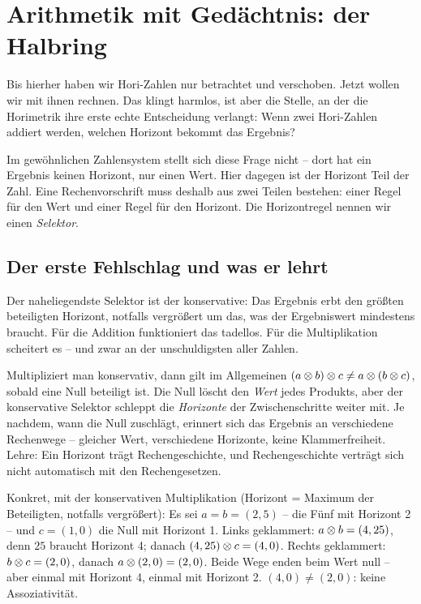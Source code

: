 \chapter{Arithmetik mit Gedächtnis: der Halbring}
\label{ch:arithmetik}


Bis hierher haben wir Hori-Zahlen nur betrachtet und verschoben.
Jetzt wollen wir mit ihnen rechnen. Das klingt harmlos,
ist aber die Stelle, an der die Horimetrik ihre erste echte
Entscheidung verlangt: Wenn zwei Hori-Zahlen addiert werden, welchen
Horizont bekommt das Ergebnis?

Im gewöhnlichen Zahlensystem stellt sich diese Frage nicht -- dort hat
ein Ergebnis keinen Horizont, nur einen Wert. Hier dagegen ist der
Horizont Teil der Zahl. Eine Rechenvorschrift muss deshalb aus zwei
Teilen bestehen: einer Regel für den Wert und einer Regel für den
Horizont. Die Horizontregel nennen wir einen \emph{Selektor}.

\section{Der erste Fehlschlag und was er lehrt}

Der naheliegendste Selektor ist der konservative: Das Ergebnis erbt
den größten beteiligten Horizont, notfalls vergrößert um das, was der
Ergebniswert mindestens braucht. Für die Addition funktioniert das
tadellos. Für die Multiplikation scheitert es -- und zwar an der
unschuldigsten aller Zahlen.

\begin{sackgasse}
Multipliziert man konservativ, dann gilt im Allgemeinen
$(a\otimes b)\otimes c\ne a\otimes(b\otimes c)$, sobald eine Null
beteiligt ist. Die Null löscht den \emph{Wert} jedes Produkts, aber
der konservative Selektor schleppt die \emph{Horizonte} der
Zwischenschritte weiter mit. Je nachdem, wann die Null zuschlägt,
erinnert sich das Ergebnis an verschiedene Rechenwege -- gleicher
Wert, verschiedene Horizonte, keine Klammerfreiheit. Lehre: Ein
Horizont trägt Rechengeschichte, und Rechengeschichte verträgt sich
nicht automatisch mit den Rechengesetzen.
\end{sackgasse}

\begin{beispiel}
Konkret, mit der konservativen Multiplikation (Horizont = Maximum
der Beteiligten, notfalls vergrößert): Es sei $a=b=(2,5)$ -- die
Fünf mit Horizont 2 -- und $c=(1,0)$ die Null mit Horizont 1. Links
geklammert: $a\otimes b=(4,25)$, denn $25$ braucht Horizont 4;
danach $(4,25)\otimes c=(4,0)$. Rechts geklammert:
$b\otimes c=(2,0)$, danach $a\otimes(2,0)=(2,0)$. Beide Wege enden
beim Wert null -- aber einmal mit Horizont 4, einmal mit Horizont 2.
$(4,0)\ne(2,0)$: keine Assoziativität.
\end{beispiel}

